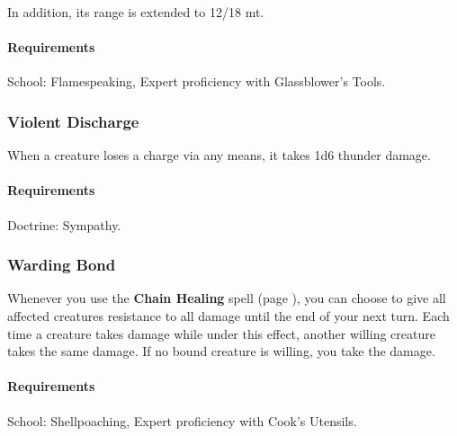    In addition, its range is extended to 12/18 mt.
    \paragraph{Requirements} School: Flamespeaking, Expert proficiency with Glassblower's Tools.
\subsubsection{Violent Discharge} \label{feat::violentdischarge}
    When a creature loses a charge via any means, it takes 1d6 thunder damage.
    \paragraph{Requirements} Doctrine: Sympathy.
\subsubsection{Warding Bond} \label{feat::wardingbond}
    Whenever you use the \textbf{Chain Healing} spell (page \pageref{spell::chainhealing}), you can choose to give all affected creatures resistance to all damage until the end of your next turn.
    Each time a creature takes damage while under this effect, another willing creature takes the same damage.
    If no bound creature is willing, you take the damage.
    \paragraph{Requirements} School: Shellpoaching, Expert proficiency with Cook's Utensils.

\newpage~\newpage
